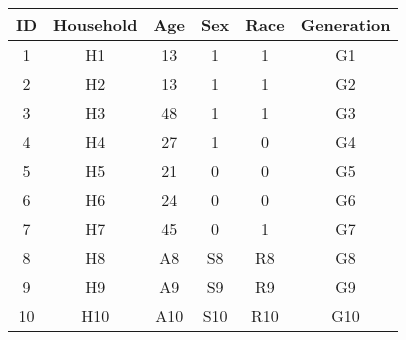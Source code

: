 \begin{tabular}{cccccc}
ID & Household & Age & Sex & Race & Generation \\
\hline
\hline
1 & H1 & 13 & 1 & 1 & G1  \\
\hline
2 & H2 & 13 & 1 & 1 & G2  \\
\hline
3 & H3 & 48 & 1 & 1 & G3  \\
\hline
4 & H4 & 27 & 1 & 0 & G4  \\
\hline
5 & H5 & 21 & 0 & 0 & G5  \\
\hline
6 & H6 & 24 & 0 & 0 & G6  \\
\hline
7 & H7 & 45 & 0 & 1 & G7  \\
\hline
8 & H8 & A8 & S8 & R8 & G8  \\
\hline
9 & H9 & A9 & S9 & R9 & G9  \\
\hline
10 & H10 & A10 & S10 & R10 & G10  \\
\hline
\end{tabular}
